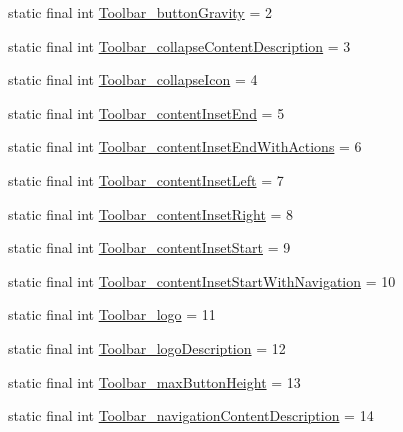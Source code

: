 \begin{DoxyCompactItemize}
\item 
static final int \mbox{\hyperlink{classcom_1_1google_1_1android_1_1gms_1_1R_1_1styleable_ab619b3c0f1c9da278f0337bb855ffb1f}{Toolbar\+\_\+button\+Gravity}} = 2
\item 
static final int \mbox{\hyperlink{classcom_1_1google_1_1android_1_1gms_1_1R_1_1styleable_aaa444bea4abcd0db7950dbe2ac1bdb51}{Toolbar\+\_\+collapse\+Content\+Description}} = 3
\item 
static final int \mbox{\hyperlink{classcom_1_1google_1_1android_1_1gms_1_1R_1_1styleable_aa5b09c4e3f7536eb1b0b11ef845548a1}{Toolbar\+\_\+collapse\+Icon}} = 4
\item 
static final int \mbox{\hyperlink{classcom_1_1google_1_1android_1_1gms_1_1R_1_1styleable_aa3b2d6d530afa76a54b54d15165b7f17}{Toolbar\+\_\+content\+Inset\+End}} = 5
\item 
static final int \mbox{\hyperlink{classcom_1_1google_1_1android_1_1gms_1_1R_1_1styleable_aa2040b1f2e9eff6595c3ee1a401a2f43}{Toolbar\+\_\+content\+Inset\+End\+With\+Actions}} = 6
\item 
static final int \mbox{\hyperlink{classcom_1_1google_1_1android_1_1gms_1_1R_1_1styleable_a5a4bd5772bd1432c29dc8725c295e837}{Toolbar\+\_\+content\+Inset\+Left}} = 7
\item 
static final int \mbox{\hyperlink{classcom_1_1google_1_1android_1_1gms_1_1R_1_1styleable_aa37de5d82d37da47a9179817ce9226bb}{Toolbar\+\_\+content\+Inset\+Right}} = 8
\item 
static final int \mbox{\hyperlink{classcom_1_1google_1_1android_1_1gms_1_1R_1_1styleable_a9c30c2471ab414434f46f12855a4e498}{Toolbar\+\_\+content\+Inset\+Start}} = 9
\item 
static final int \mbox{\hyperlink{classcom_1_1google_1_1android_1_1gms_1_1R_1_1styleable_a805e71df220b65c8eff24da0935ec844}{Toolbar\+\_\+content\+Inset\+Start\+With\+Navigation}} = 10
\item 
static final int \mbox{\hyperlink{classcom_1_1google_1_1android_1_1gms_1_1R_1_1styleable_aacccab44479a8f518f00d9dc01e7a6f8}{Toolbar\+\_\+logo}} = 11
\item 
static final int \mbox{\hyperlink{classcom_1_1google_1_1android_1_1gms_1_1R_1_1styleable_af0c2216b5e1175ca842fc0f11bf7bd90}{Toolbar\+\_\+logo\+Description}} = 12
\item 
static final int \mbox{\hyperlink{classcom_1_1google_1_1android_1_1gms_1_1R_1_1styleable_aa57e015cc426c62da8edb209ef1492c2}{Toolbar\+\_\+max\+Button\+Height}} = 13
\item 
static final int \mbox{\hyperlink{classcom_1_1google_1_1android_1_1gms_1_1R_1_1styleable_a42e5100d45b847ae9dc3911983bb8d33}{Toolbar\+\_\+navigation\+Content\+Description}} = 14

\end{DoxyCompactItemize}
